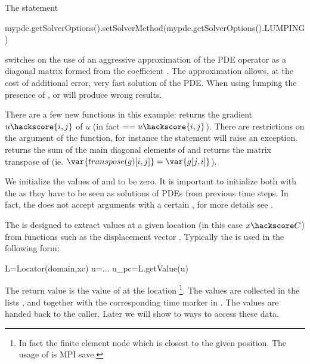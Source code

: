 The statement 
\begin{python}
mypde.getSolverOptions().setSolverMethod(mypde.getSolverOptions().LUMPING) 
\end{python}
switches on the use of an aggressive approximation of the PDE operator as a diagonal matrix
formed from the coefficient .
The approximation allows, at the cost of 
additional error, very fast 
solution of the PDE. When using lumping the presence of ,  or  will produce wrong results.
 
There are a few new \escript functions in this example: 
 returns the gradient $u\hackscore{i,j}$ of $u$ (in fact =$=u\hackscore{i,j}$).
There are restrictions on the argument of the  function, for instance
the statement  will raise an exception.
 returns the sum of the main diagonal elements  of  
and  returns the matrix transpose of  (ie. $\var{transpose(g)[i,j]}=\var{g[j,i]}$). 

We initialize the values of  and  to be zero. It is important
to initialize both with the \SolutionFS \FunctionSpace as they have to be seen as solutions of PDEs from previous time steps. In fact, the  does not accept arguments with a certain \FunctionSpace, for more details see . 

The  is designed to extract values at a given location (in this case $x\hackscore C$) from functions such as the displacement vector . Typically the  is used in the following form:  
\begin{python}
L=Locator(domain,xc)
u=...
u_pc=L.getValue(u)
\end{python}
The return value  is the value of  at the location \footnote{In fact the finite element node which is closest to the given position. The usage of   is MPI save.}. The values
are collected in the lists ,  and  together with the 
corresponding time marker in . The values are handed back to the caller. Later we will show to ways to
access these data.

